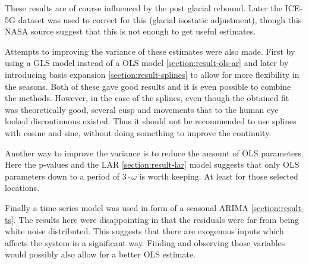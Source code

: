 These results are of course influenced by the post glacial rebound. Later the ICE-5G dataset was  used to correct for this (glacial isostatic adjustment), though this NASA source \cite{nasa-gia-incomplete} suggest that this is not enough to get useful estimates.

Attempts to improving the variance of these estimates were also made. First by using a GLS model instead of a OLS model \ref{section:result-ols-ar} and later by introducing basis expansion \ref{section:result-splines} to allow for more flexibility in the seasons. Both of these gave good results and it is even possible to combine the methods. However, in the case of the splines, even though the obtained fit was theoretically good, several cusp and movements that to the human eye looked discontinuous existed. Thus it should not be recommended to use splines with cosine and sine, without doing something to improve the continuity.

Another way to improve the variance is to reduce the amount of OLS parameters. Here the p-values and the LAR \ref{section:result-lar} model suggests that only OLS parameters down to a period of $3 \cdot \omega$ is worth keeping. At least for those selected locations.

Finally a time series model was used in form of a seasonal ARIMA \ref{section:result-ts}. The results here were disappointing in that the residuals were far from being white noise distributed. This suggests that there are exogenous inputs which affects the system in a significant way. Finding and observing those variables would possibly also allow for a better OLS estimate. 
